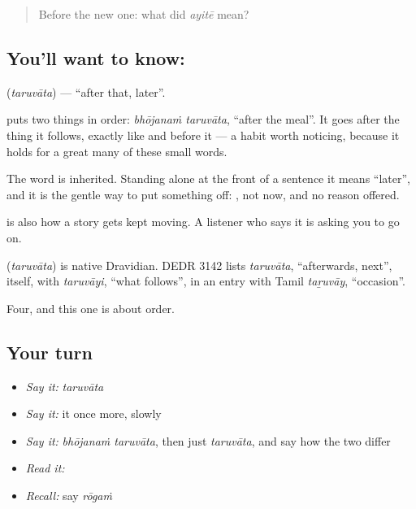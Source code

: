 \label{lesson:TE-C64-after}



\begin{quote}
Before the new one: what did \emph{ayitē} mean?
\end{quote}

\subsection*{You'll want to know: }
\textbf{} (\emph{taruvāta}) — \textquotedblleft{}after that, later\textquotedblright{}.

 puts two things in order: \emph{bhōjanaṁ taruvāta}, \textquotedblleft{}after the meal\textquotedblright{}. It goes after the thing it follows, exactly like  and  before it — a habit worth noticing, because it holds for a great many of these small words.

The word is inherited. Standing alone at the front of a sentence it means \textquotedblleft{}later\textquotedblright{}, and it is the gentle way to put something off: , not now, and no reason offered.

 is also how a story gets kept moving. A listener who says it is asking you to go on.

\begin{cousinweb}
\textbf{} (\emph{taruvāta}) is native Dravidian. DEDR 3142 lists \emph{taruvāta}, \textquotedblleft{}afterwards, next\textquotedblright{}, itself, with \emph{taruvāyi}, \textquotedblleft{}what follows\textquotedblright{}, in an entry with Tamil \emph{taṟuvāy}, \textquotedblleft{}occasion\textquotedblright{}.
\end{cousinweb}

\begin{grammarlens}[title={What you've built}]
Four, and this one is about order.
\end{grammarlens}

\subsection*{Your turn}
\begin{itemize}
\raggedright
  \item \emph{Say it:} \emph{taruvāta}
  \item \emph{Say it:} it once more, slowly
  \item \emph{Say it:} \emph{bhōjanaṁ taruvāta}, then just \emph{taruvāta}, and say how the two differ
  \item \emph{Read it:} \textbf{}
  \item \emph{Recall:} say \emph{rōgaṁ}
\end{itemize}

